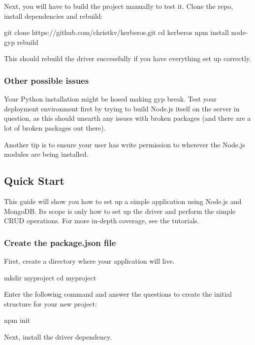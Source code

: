 Next, you will have to build the project manually to test it. Clone the repo, install dependencies and rebuild\+:


\begin{DoxyCode}
git clone https://github.com/christkv/kerberos.git
cd kerberos
npm install
node-gyp rebuild
\end{DoxyCode}


This should rebuild the driver successfully if you have everything set up correctly.

\subsubsection*{Other possible issues}

Your Python installation might be hosed making gyp break. Test your deployment environment first by trying to build Node.\+js itself on the server in question, as this should unearth any issues with broken packages (and there are a lot of broken packages out there).

Another tip is to ensure your user has write permission to wherever the Node.\+js modules are being installed.

\subsection*{Quick Start}

This guide will show you how to set up a simple application using Node.\+js and Mongo\+DB. Its scope is only how to set up the driver and perform the simple C\+R\+UD operations. For more in-\/depth coverage, see the tutorials.

\subsubsection*{Create the {\ttfamily package.\+json} file}

First, create a directory where your application will live.


\begin{DoxyCode}
mkdir myproject
cd myproject
\end{DoxyCode}


Enter the following command and answer the questions to create the initial structure for your new project\+:


\begin{DoxyCode}
npm init
\end{DoxyCode}


Next, install the driver dependency.


